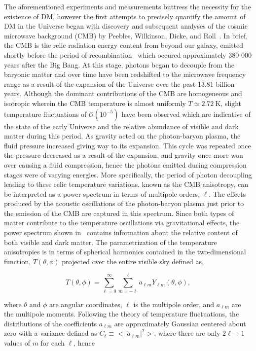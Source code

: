 The aforementioned experiments and measurements buttress the necessity for the existence of DM, however the first attempts to precisely quantify the amount of DM in the Universe began with discovery and subsequent analyses of the cosmic microwave background (CMB) by Peebles, Wilkinson, Dicke, and Roll~\cite{Dicke1965}. In brief, the CMB is the relic radiation energy content from beyond our galaxy, emitted shortly before the period of recombination~\cite{Seager:1999km} which occured approximately 380 000 years after the Big Bang. At this stage, photons began to decouple from the baryonic matter and over time have been redshifted to the microwave frequency range as a result of the expansion of the Universe over the past 13.81 billion years. Although the dominant contributions of the CMB are homogeneous and isotropic wherein the CMB temperature is almost uniformly $T\simeq2.72\:\mathrm{K}$, slight temperature fluctuations of $\mathcal{O}(10^{-5})$ have been observed which are indicative of the state of the early Universe and the relative abundance of visible and dark matter during this period. As gravity acted on the photon-baryon plasma, the fluid pressure increased giving way to its expansion. This cycle was repeated once the pressure decreased as a result of the expansion, and gravity once more won over causing a fluid compression, hence the photons emitted during compression stages were of varying energies. More specifically, the period of photon decoupling leading to these relic temperature variations, known as the CMB anisotropy, can be interpreted as a power spectrum in terms of multipole orders, $\ell$. The effects produced by the acoustic oscillations of the photon-baryon plasma just prior to the emission of the CMB are captured in this spectrum. Since both types of matter contribute to the temperature oscillations via gravitational effects, the power spectrum shown in~ contains information about the relative content of both visible and dark matter. The parametrization of the temperature anisotropies is in terms of spherical harmonics contained in the two-dimensional function, $T(\theta,\phi)$ projected over the entire visible sky defined as,

\begin{equation}
  T(\theta,\phi) = \sum^{\infty}_{\ell=0}\sum^{\ell}_{m=-\ell}a_{\ell m}Y_{\ell m}(\theta,\phi),
\end{equation}

where $\theta$ and $\phi$ are angular coordinates, $\ell$ is the multipole order, and $a_{\ell m}$ are the multipole moments. Following the theory of temperature fluctuations, the distributions of the coefficients $a_{\ell m}$ are approximately Gaussian centered about zero with a variance defined as $C_{\ell} \equiv <|a_{\ell m}|^{2}>$, where there are only $2\ell+1$ values of $m$ for each $\ell$, hence

